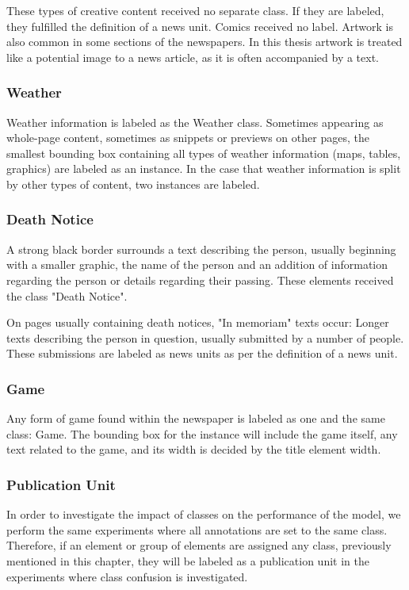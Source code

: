 \documentclass[oneside, english, bibtex]{kththesis}
\begin{document}
These types of creative content received no separate class. If they are labeled, they fulfilled the definition of a news unit. Comics received no label.
Artwork is also common in some sections of the newspapers. In this thesis artwork is treated like a potential image to a news article, as it is often accompanied by a text.

\subsubsection{Weather}

Weather information is labeled as the Weather class.
Sometimes appearing as whole-page content, sometimes as snippets or previews on other pages, the smallest bounding box containing all types of weather information (maps, tables, graphics) are labeled as an instance.
In the case that weather information is split by other types of content, two instances are labeled.

\subsubsection{Death Notice}

A strong black border surrounds a text describing the person, usually beginning with a smaller graphic,
the name of the person and an addition of information regarding the person or details regarding their passing. These elements received the class "Death Notice".

On pages usually containing death notices, "In memoriam" texts occur: Longer texts describing the person in question, usually submitted by a number of people.
These submissions are labeled as news units as per the definition of a news unit.

\subsubsection{Game}

Any form of game found within the newspaper is labeled as one and the same class: Game.
The bounding box for the instance will include the game itself, any text related to the game, and its width is decided by the title element width.

\subsubsection{Publication Unit}

In order to investigate the impact of classes on the performance of the model, we perform the same experiments where all annotations are set to the same class.
Therefore, if an element or group of elements are assigned any class, previously mentioned in this chapter, they will be labeled as a publication unit in the experiments where class confusion is investigated.
\end{document}
